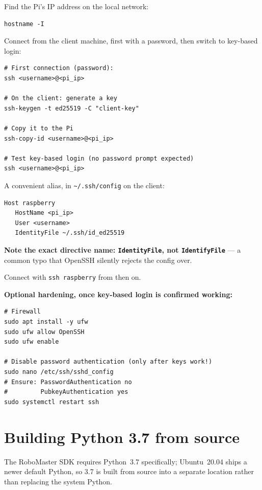 \documentclass[11pt]{report}
\begin{document}
Find the Pi's IP address on the local network:

\begin{lstlisting}[style=shell]
hostname -I
\end{lstlisting}

Connect from the client machine, first with a password, then switch to
key-based login:

\begin{lstlisting}[style=shell]
# First connection (password):
ssh <username>@<pi_ip>

# On the client: generate a key
ssh-keygen -t ed25519 -C "client-key"

# Copy it to the Pi
ssh-copy-id <username>@<pi_ip>

# Test key-based login (no password prompt expected)
ssh <username>@<pi_ip>
\end{lstlisting}

A convenient alias, in \texttt{\textasciitilde/.ssh/config} on the client:

\begin{lstlisting}[style=code]
Host raspberry
   HostName <pi_ip>
   User <username>
   IdentityFile ~/.ssh/id_ed25519
\end{lstlisting}

\textbf{Note the exact directive name: \texttt{IdentityFile}, not
\texttt{IdentifyFile}} --- a common typo that OpenSSH silently rejects the
config over.

Connect with \texttt{ssh raspberry} from then on.

\textbf{Optional hardening, once key-based login is confirmed working:}

\begin{lstlisting}[style=shell]
# Firewall
sudo apt install -y ufw
sudo ufw allow OpenSSH
sudo ufw enable

# Disable password authentication (only after keys work!)
sudo nano /etc/ssh/sshd_config
# Ensure: PasswordAuthentication no
#         PubkeyAuthentication yes
sudo systemctl restart ssh
\end{lstlisting}

\section{Building Python 3.7 from source}

The RoboMaster SDK requires Python~3.7 specifically; Ubuntu~20.04 ships a
newer default Python, so 3.7 is built from source into a separate location
rather than replacing the system Python.
\end{document}
